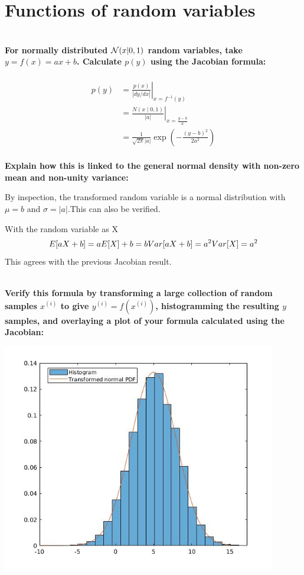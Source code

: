 \documentclass[12pt]{article}
\begin{document}
\section{\bf Functions of random variables}\\
{\bf For normally distributed ${\cal N}(x|0,1)$ random variables, take $y=f(x)=ax+b$. Calculate $p(y)$ using the Jacobian formula:}
\\\\
{\em
\begin{equation*}
\begin{split}
  p(y)& = \left.\frac{p(x)}{|dy/dx|}\right|_{x=f^{-1}(y)} \\
      & = \left.\frac{N\left(x\middle|0,1\right)}{|a|}\right|_{x=\frac{y-b}{a}} \\
      & = \frac{1}{\sqrt{2\pi}|a|}\exp{(-\frac{(y-b)^2}{2a^2})}
\end{split}
\end{equation*}
}
\pagebreak
\\
{\bf Explain how this is linked to the general normal density with non-zero mean and non-unity variance:}
\par\smallskip
{\textsf
By inspection, the transformed random variable is a normal distribution with $\mu =b$ and $\sigma =|a|$.This can also be verified.
\par\smallskip
With the random variable as X
\[
E[aX+b] = aE[X] + b = b \\
Var[aX+b] = a^2Var[X] = a^2  
\]
This agrees with the previous Jacobian result.
}
\par\bigskip
\\
{\bf Verify this formula by transforming a large collection of random samples $x^{(i)}$ to give $y^{(i)}=f(x^{(i)})$, histogramming the resulting $y$ samples, and overlaying a plot of your formula calculated using the Jacobian:}
\\
\begin{center}
\includegraphics[width=0.9\textwidth]{norm-lin-y.jpg}
\end{center}
\end{document}
